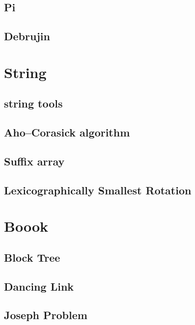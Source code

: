 \documentclass[a4paper,10pt,twocolumn,oneside]{article}
\begin{document}
\subsection{Pi}


\subsection{Debrujin}


\section{String}
\subsection{string tools}


\subsection{Aho–Corasick algorithm}


\subsection{Suffix array}


\subsection{Lexicographically Smallest Rotation}

\section{Boook}

\subsection{Block Tree}


\subsection{Dancing Link}


\subsection{Joseph Problem}

\end{document}
